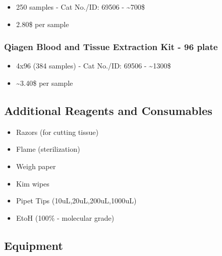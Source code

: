 \documentclass[
  letterpaper,
  DIV=11,
  numbers=noendperiod]{scrreprt}
\begin{document}
\begin{itemize}
\item
  250 samples - Cat No./ID: 69506 - \textasciitilde700\$
\item
  2.80\$ per sample
\end{itemize}

\hypertarget{qiagen-blood-and-tissue-extraction-kit---96-plate}{%
\subsubsection*{\texorpdfstring{\textbf{Qiagen Blood and Tissue
Extraction Kit - 96
plate}}{Qiagen Blood and Tissue Extraction Kit - 96 plate}}\label{qiagen-blood-and-tissue-extraction-kit---96-plate}}

\begin{itemize}
\item
  4x96 (384 samples) - Cat No./ID: 69506 - \textasciitilde1300\$
\item
  \textasciitilde3.40\$ per sample
\end{itemize}

\hypertarget{additional-reagents-and-consumables}{%
\subsection*{\texorpdfstring{\textbf{Additional Reagents and
Consumables}}{Additional Reagents and Consumables}}\label{additional-reagents-and-consumables}}

\begin{itemize}
\item
  Razors (for cutting tissue)
\item
  Flame (sterilization)
\item
  Weigh paper
\item
  Kim wipes
\item
  Pipet Tips (10uL,20uL,200uL,1000uL)
\item
  EtoH (100\% - molecular grade)
\end{itemize}

\hypertarget{equipment}{%
\subsection*{\texorpdfstring{\textbf{Equipment}}{Equipment}}\label{equipment}}
\end{document}
